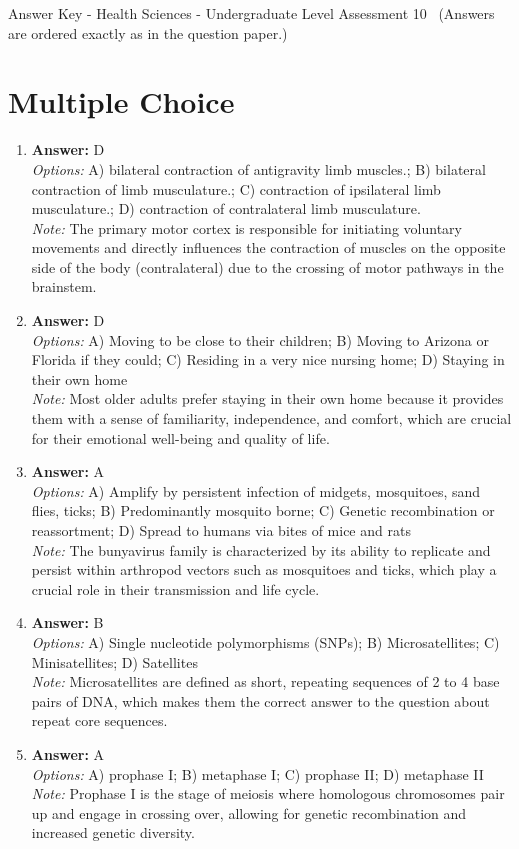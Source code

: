 \documentclass[12pt]{article}
\begin{document}
\begin{center}
Answer Key - Health Sciences - Undergraduate Level Assessment 10 \
\small (Answers are ordered exactly as in the question paper.)
\end{center}

\section*{Multiple Choice}
\begin{enumerate}[label=\arabic*.]
\item \textbf{Answer:} D
\\ \textit{Options:} A) bilateral contraction of antigravity limb muscles.; B) bilateral contraction of limb musculature.; C) contraction of ipsilateral limb musculature.; D) contraction of contralateral limb musculature.
\\ \textit{Note:} The primary motor cortex is responsible for initiating voluntary movements and directly influences the contraction of muscles on the opposite side of the body (contralateral) due to the crossing of motor pathways in the brainstem.
\item \textbf{Answer:} D
\\ \textit{Options:} A) Moving to be close to their children; B) Moving to Arizona or Florida if they could; C) Residing in a very nice nursing home; D) Staying in their own home
\\ \textit{Note:} Most older adults prefer staying in their own home because it provides them with a sense of familiarity, independence, and comfort, which are crucial for their emotional well-being and quality of life.
\item \textbf{Answer:} A
\\ \textit{Options:} A) Amplify by persistent infection of midgets, mosquitoes, sand flies, ticks; B) Predominantly mosquito borne; C) Genetic recombination or reassortment; D) Spread to humans via bites of mice and rats
\\ \textit{Note:} The bunyavirus family is characterized by its ability to replicate and persist within arthropod vectors such as mosquitoes and ticks, which play a crucial role in their transmission and life cycle.
\item \textbf{Answer:} B
\\ \textit{Options:} A) Single nucleotide polymorphisms (SNPs); B) Microsatellites; C) Minisatellites; D) Satellites
\\ \textit{Note:} Microsatellites are defined as short, repeating sequences of 2 to 4 base pairs of DNA, which makes them the correct answer to the question about repeat core sequences.
\item \textbf{Answer:} A
\\ \textit{Options:} A) prophase I; B) metaphase I; C) prophase II; D) metaphase II
\\ \textit{Note:} Prophase I is the stage of meiosis where homologous chromosomes pair up and engage in crossing over, allowing for genetic recombination and increased genetic diversity.
\end{enumerate}
\end{document}
